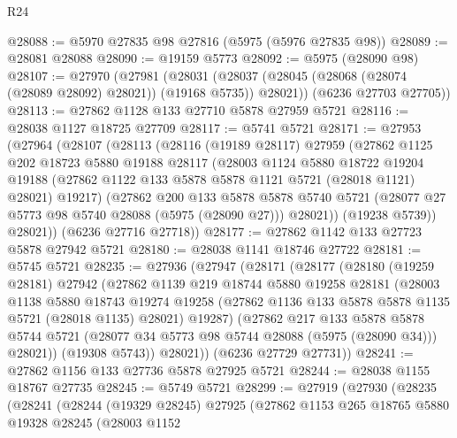 \begin{lexlean}{R24}
\begin{coremodule}
@28088 := @5970 @27835 @98 @27816 (@5975 (@5976 @27835 @98))
@28089 := @28081 @28088
@28090 := @19159 @5773
@28092 := @5975 (@28090 @98)
@28107 := @27970
    (@27981
      (@28031 (@28037 (@28045 (@28068 (@28074 (@28089 @28092) @28021)) (@19168 @5735)) @28021))
      (@6236 @27703 @27705))
@28113 := @27862 @1128 @133 @27710 @5878 @27959 @5721
@28116 := @28038 @1127 @18725 @27709
@28117 := @5741 @5721
@28171 := @27953
    (@27964
      (@28107
        (@28113
          (@28116
            (@19189 @28117)
            @27959
            (@27862
              @1125
              @202
              @18723
              @5880
              @19188
              @28117
              (@28003
                @1124
                @5880
                @18722
                @19204
                @19188
                (@27862 @1122 @133 @5878 @5878 @1121 @5721 (@28018 @1121) @28021)
                @19217)
              (@27862
                @200
                @133
                @5878
                @5878
                @5740
                @5721
                (@28077 @27 @5773 @98 @5740 @28088 (@5975 (@28090 @27)))
                @28021))
            (@19238 @5739))
          @28021))
      (@6236 @27716 @27718))
@28177 := @27862 @1142 @133 @27723 @5878 @27942 @5721
@28180 := @28038 @1141 @18746 @27722
@28181 := @5745 @5721
@28235 := @27936
    (@27947
      (@28171
        (@28177
          (@28180
            (@19259 @28181)
            @27942
            (@27862
              @1139
              @219
              @18744
              @5880
              @19258
              @28181
              (@28003
                @1138
                @5880
                @18743
                @19274
                @19258
                (@27862 @1136 @133 @5878 @5878 @1135 @5721 (@28018 @1135) @28021)
                @19287)
              (@27862
                @217
                @133
                @5878
                @5878
                @5744
                @5721
                (@28077 @34 @5773 @98 @5744 @28088 (@5975 (@28090 @34)))
                @28021))
            (@19308 @5743))
          @28021))
      (@6236 @27729 @27731))
@28241 := @27862 @1156 @133 @27736 @5878 @27925 @5721
@28244 := @28038 @1155 @18767 @27735
@28245 := @5749 @5721
@28299 := @27919
    (@27930
      (@28235
        (@28241
          (@28244
            (@19329 @28245)
            @27925
            (@27862
              @1153
              @265
              @18765
              @5880
              @19328
              @28245
              (@28003
                @1152

\end{coremodule}
\end{lexlean}
